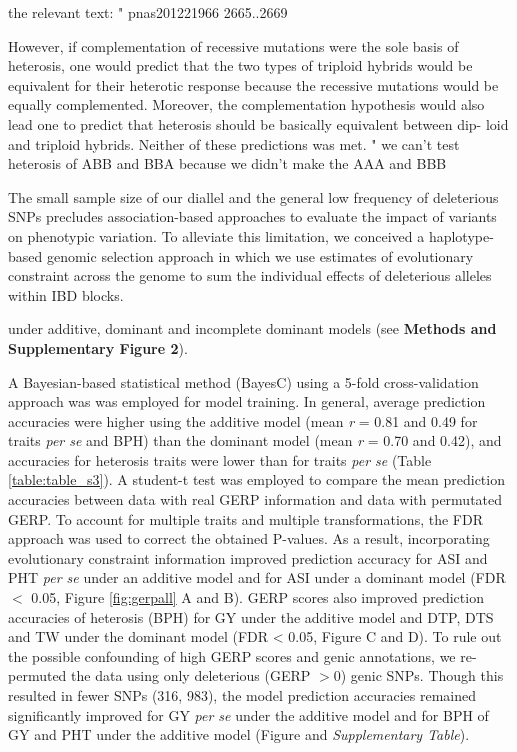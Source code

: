 \documentclass[twoside,twocolumn, letterpaper]{article}
\begin{document}
the relevant text:
" pnas201221966 2665..2669 

However, if complementation of recessive mutations were the sole basis of heterosis, one would predict that the two types of triploid hybrids would be equivalent for their heterotic response because the recessive mutations would be equally complemented. Moreover, the complementation hypothesis would also lead one to predict that heterosis should be basically equivalent between dip- loid and triploid hybrids. Neither of these predictions was met. 
"
we can't test heterosis of ABB and BBA because we didn't make the AAA and BBB



The small sample size of our diallel and the general low frequency of deleterious SNPs precludes association-based approaches to evaluate the impact of variants on phenotypic variation.
To alleviate this limitation, we conceived a haplotype-based genomic selection approach in which we use estimates of evolutionary constraint across the genome to sum the individual effects of deleterious alleles within IBD blocks.

under additive, dominant and incomplete dominant models (see \textbf{Methods and Supplementary Figure 2}). %

A Bayesian-based statistical method (BayesC) \citep{habier2011extension} using a 5-fold cross-validation approach was was employed for model training. 
In general, average prediction accuracies were higher using the additive model (mean \emph{r} = 0.81 and 0.49 for traits \emph{per se} and BPH) than the dominant model (mean \emph{r} = 0.70 and 0.42), and accuracies for heterosis traits were lower than for traits \emph{per se} (Table \ref{table:table_s3}).  A student-t test was employed to compare the mean prediction accuracies between data with real GERP information and data with permutated GERP. To account for multiple traits and multiple transformations, the FDR approach was used to correct the obtained P-values. As a result, incorporating evolutionary constraint information improved prediction accuracy for ASI and PHT \emph{per se} under an additive model and for ASI under a dominant model (FDR $<$ 0.05, Figure \ref{fig:gerpall} A and B).
GERP scores also improved prediction accuracies of heterosis (BPH) for GY under the additive model and DTP, DTS and TW under the dominant model (FDR < 0.05, Figure C and D). 
To rule out the possible confounding of high GERP scores and genic annotations, we re-permuted the data using only deleterious (GERP $> 0$) genic SNPs.  
Though this resulted in fewer SNPs (316, 983), the model prediction accuracies remained significantly improved for GY \emph{per se} under the additive model and for BPH of GY and PHT under the additive model (Figure and \emph{Supplementary Table}). %
\end{document}
